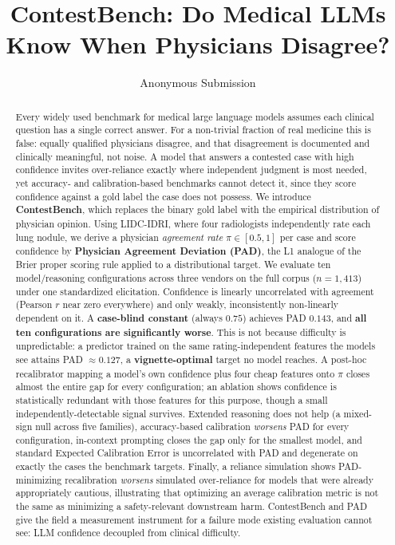 \documentclass[letterpaper]{article} %
\title{ContestBench: Do Medical LLMs Know When Physicians Disagree?}
\author{Anonymous Submission}
\begin{document}
\maketitle

\begin{abstract}
Every widely used benchmark for medical large language models assumes each
clinical question has a single correct answer. For a non-trivial fraction of
real medicine this is false: equally qualified physicians disagree, and that
disagreement is documented and clinically meaningful, not noise. A model that
answers a contested case with high confidence invites over-reliance exactly
where independent judgment is most needed, yet accuracy- and
calibration-based benchmarks cannot detect it, since they score confidence
against a gold label the case does not possess. We introduce
\textbf{ContestBench}, which replaces the binary gold label with the
empirical distribution of physician opinion. Using LIDC-IDRI, where four
radiologists independently rate each lung nodule, we derive a physician
\emph{agreement rate} $\pi \in [0.5,1]$ per case and score confidence by
\textbf{Physician Agreement Deviation (PAD)}, the L1 analogue of the Brier
proper scoring rule applied to a distributional target. We evaluate ten
model/reasoning configurations across three vendors on the full corpus
($n{=}1{,}413$) under one standardized elicitation. Confidence is linearly
uncorrelated with agreement (Pearson $r$ near zero everywhere) and only
weakly, inconsistently non-linearly dependent on it. A \textbf{case-blind
constant} (always $0.75$) achieves PAD $0.143$, and \textbf{all ten
configurations are significantly worse}. This is not because difficulty is
unpredictable: a predictor trained on the same rating-independent features
the models see attains PAD $\approx 0.127$, a \textbf{vignette-optimal}
target no model reaches. A post-hoc recalibrator mapping a model's own
confidence plus four cheap features onto $\pi$ closes almost the entire gap
for every configuration; an ablation shows confidence is statistically
redundant with those features for this purpose, though a small
independently-detectable signal survives. Extended reasoning does not help
(a mixed-sign null across five families), accuracy-based calibration
\emph{worsens} PAD for every configuration, in-context prompting closes the
gap only for the smallest model, and standard Expected Calibration Error is
uncorrelated with PAD and degenerate on exactly the cases the benchmark
targets. Finally, a reliance simulation shows PAD-minimizing recalibration
\emph{worsens} simulated over-reliance for models that were already
appropriately cautious, illustrating that optimizing an average calibration
metric is not the same as minimizing a safety-relevant downstream harm.
ContestBench and PAD give the field a measurement instrument for a failure
mode existing evaluation cannot see: LLM confidence decoupled from clinical
difficulty.
\end{abstract}
\end{document}
